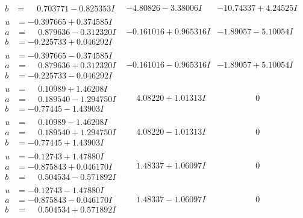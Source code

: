 \documentclass[1p]{elsarticle_modified}
\theoremstyle{definition}
\begin{document}
$$\begin{array}{c|c|c}
\begin{aligned}
b &= \phantom{-}0.703771 - 0.825353 I\end{aligned}
 & -4.80826 - 3.38006 I & -10.74337 + 4.24525 I \\ \hline\begin{aligned}
u &= -0.397665 + 0.374585 I \\
a &= \phantom{-}0.879636 - 0.312320 I \\
b &= -0.225733 + 0.046292 I\end{aligned}
 & -0.161016 + 0.965316 I & -1.89057 - 5.10054 I \\ \hline\begin{aligned}
u &= -0.397665 - 0.374585 I \\
a &= \phantom{-}0.879636 + 0.312320 I \\
b &= -0.225733 - 0.046292 I\end{aligned}
 & -0.161016 - 0.965316 I & -1.89057 + 5.10054 I \\ \hline\begin{aligned}
u &= \phantom{-}0.10989 + 1.46208 I \\
a &= \phantom{-}0.189540 - 1.294750 I \\
b &= -0.77445 - 1.43903 I\end{aligned}
 & \phantom{-}4.08220 + 1.01313 I & \phantom{-0.000000 } 0 \\ \hline\begin{aligned}
u &= \phantom{-}0.10989 - 1.46208 I \\
a &= \phantom{-}0.189540 + 1.294750 I \\
b &= -0.77445 + 1.43903 I\end{aligned}
 & \phantom{-}4.08220 - 1.01313 I & \phantom{-0.000000 } 0 \\ \hline\begin{aligned}
u &= -0.12743 + 1.47880 I \\
a &= -0.875843 + 0.046170 I \\
b &= \phantom{-}0.504534 - 0.571892 I\end{aligned}
 & \phantom{-}1.48337 + 1.06097 I & \phantom{-0.000000 } 0 \\ \hline\begin{aligned}
u &= -0.12743 - 1.47880 I \\
a &= -0.875843 - 0.046170 I \\
b &= \phantom{-}0.504534 + 0.571892 I\end{aligned}
 & \phantom{-}1.48337 - 1.06097 I & \phantom{-0.000000 } 0 \\ \hline\begin{aligned}

\end{aligned}
\end{array}$$
\end{document}
